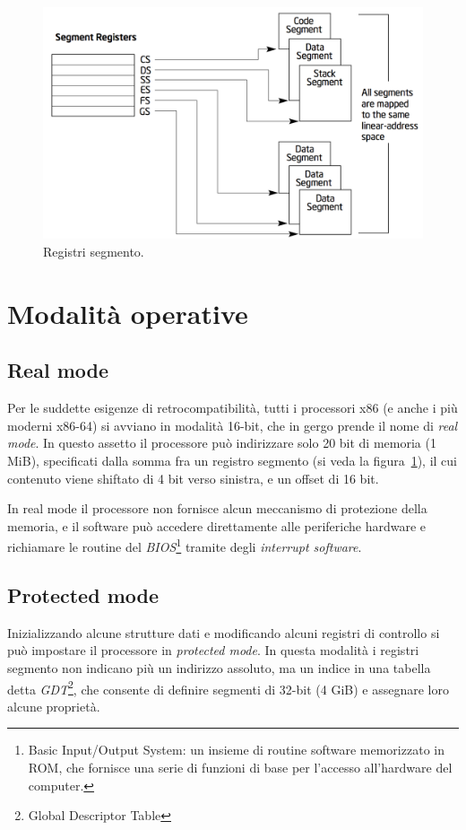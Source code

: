 \documentclass[12pt,a4paper]{report}
\begin{document}
		\begin{figure}[b!]
		\centering
		\includegraphics[scale=0.5]{img/segment.png}
		\caption{Registri segmento. \cite{Intel}\label{fig:segment}}
		\end{figure}

	\section{Modalità operative}
		\subsection{Real mode}
			Per le suddette esigenze di retrocompatibilità, tutti i processori x86 (e anche i più moderni x86-64) si avviano
			in modalità 16-bit, che in gergo prende il nome di \emph{real mode}.
			In questo assetto il processore può indirizzare solo 20 bit di memoria (1 MiB), specificati dalla somma fra
			un registro segmento (si veda la figura~\ref{fig:segment}), il cui contenuto viene shiftato di 4 bit verso sinistra,
			e un offset di 16 bit.
		
			In real mode il processore non fornisce alcun meccanismo di protezione della memoria, e il software può
			accedere direttamente alle periferiche hardware e richiamare le routine del \emph{BIOS}\footnote{Basic Input/Output System:
			un insieme di routine software memorizzato in ROM, che fornisce una serie di funzioni di base per l'accesso all'hardware del computer.}
			tramite degli \emph{interrupt software}.
		
		\subsection{Protected mode}
			Inizializzando alcune strutture dati e modificando alcuni registri di controllo si può impostare il processore
			in \emph{protected mode}. In questa modalità i registri segmento non indicano più un indirizzo assoluto,
			ma un indice in una tabella detta \emph{GDT}\footnote{Global Descriptor Table}, che consente di definire
			segmenti di 32-bit (4 GiB) e assegnare loro alcune proprietà.
			
\end{document}
